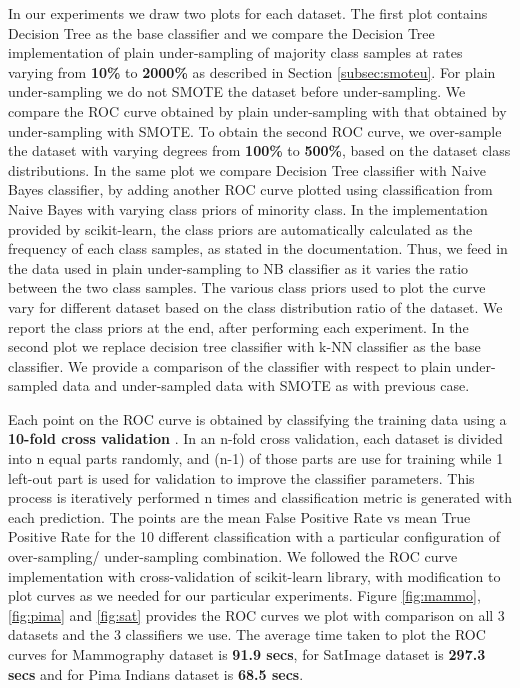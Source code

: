 \documentclass[10pt,journal,compsoc]{IEEEtran}
\begin{document}
In our experiments we draw two plots for each dataset. 
The first plot contains Decision Tree as the base classifier and we compare the Decision Tree implementation of plain under-sampling of majority class samples at rates varying from \textbf{10\%} to \textbf{2000\%} as described in Section \ref{subsec:smoteu}. 
For plain under-sampling we do not SMOTE the dataset before under-sampling.
We compare the ROC curve obtained by plain under-sampling with that obtained by under-sampling with SMOTE.
To obtain the second ROC curve, we over-sample the dataset with varying degrees from \textbf{100\%} to \textbf{500\%}, based on the dataset class distributions.
In the same plot we compare Decision Tree classifier with Naive Bayes classifier, by adding another ROC curve plotted using classification from Naive Bayes with varying class priors of minority class.
In the implementation provided by scikit-learn, the class priors are automatically calculated as the frequency of each class samples, as stated in the documentation\cite{nbayes}.
Thus, we feed in the data used in plain under-sampling to NB classifier as it varies the ratio between the two class samples. 
The various class priors used to plot the curve vary for different dataset based on the class distribution ratio of the dataset.
We report the class priors at the end, after performing each experiment.
In the second plot we replace decision tree classifier with k-NN classifier as the base classifier. 
We provide a comparison of the classifier with respect to plain under-sampled data and under-sampled data with SMOTE as with previous case.

Each point on the ROC curve is obtained by classifying the training data using a \textbf{10-fold cross validation} .
In an n-fold cross validation, each dataset is divided into n equal parts randomly, and (n-1) of those parts are use for training while 1 left-out part is used for validation to improve the classifier parameters.
This process is iteratively performed n times and classification metric is generated with each prediction.
The points are the mean False Positive Rate vs mean True Positive Rate for the 10 different classification with a particular configuration of over-sampling/ under-sampling combination.
We followed the ROC curve implementation with cross-validation of scikit-learn library\cite{roc}, with modification to plot curves as we needed for our particular experiments.
Figure \ref{fig:mammo}, \ref{fig:pima} and \ref{fig:sat} provides the ROC curves we plot with comparison on all 3 datasets and the 3 classifiers we use. 
The average time taken to plot the ROC curves for Mammography dataset is \textbf{91.9 secs}, for SatImage dataset is \textbf{297.3 secs} and for Pima Indians dataset is \textbf{68.5 secs}.
\end{document}
